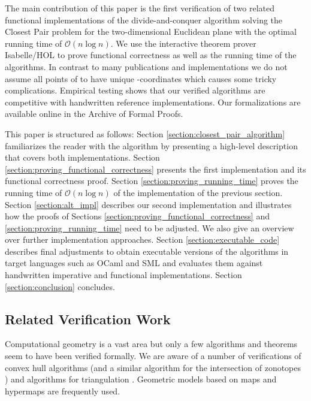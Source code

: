 \begin{isabellebody}
\begin{isamarkuptext}
The main contribution of this paper is the first verification of two related functional implementations of the
divide-and-conquer algorithm solving the Closest Pair problem for the two-dimensional Euclidean plane
with the optimal running time of $\mathcal{O}(n \log n)$. We use the interactive theorem
prover Isabelle/HOL \cite{LNCS2283,Concrete} to prove functional correctness as well as the
running time of the algorithms. In contrast to many publications and implementations we do not assume
all points of  to have unique -coordinates which causes some tricky complications. Empirical
testing shows that our verified algorithms are competitive with handwritten reference
implementations. Our formalizations are available online \cite{Closest_Pair_Points-AFP} in the
Archive of Formal Proofs.

This paper is structured as follows:
Section \ref{section:closest_pair_algorithm} familiarizes the reader with the algorithm by presenting a
high-level description that covers both implementations. Section \ref{section:proving_functional_correctness} presents the first
implementation and its functional correctness proof. Section \ref{section:proving_running_time} proves
the running time of $\mathcal{O}(n \log n)$ of the implementation of the previous section.
Section \ref{section:alt_impl} describes our second implementation and illustrates how the proofs of
Sections \ref{section:proving_functional_correctness} and \ref{section:proving_running_time} need to be adjusted.
We also give an overview over further implementation approaches.
Section \ref{section:executable_code} describes final adjustments to obtain executable versions of the algorithms in target languages
such as OCaml and SML and evaluates them against handwritten imperative and functional implementations.
Section \ref{section:conclusion} concludes.


\subsection{Related Verification Work}

Computational geometry is a vast area but only a few algorithms and theorems seem to have been
verified formally. We are aware of a number of verifications of convex hull algorithms
\cite{DBLP:conf/tphol/PichardieB01,DBLP:conf/adg/MeikleF04,DBLP:journals/comgeo/BrunDM12}
(and a similar algorithm for the intersection of zonotopes \cite{Immler:2015})
and algorithms for triangulation \cite{DBLP:conf/itp/DufourdB10,DBLP:conf/ictac/Bertot18}.
Geometric models based on maps and hypermaps
\cite{DBLP:journals/tcs/PuitgD00,DBLP:journals/jar/Dufourd09} are frequently used.


\end{isamarkuptext}
\end{isabellebody}
